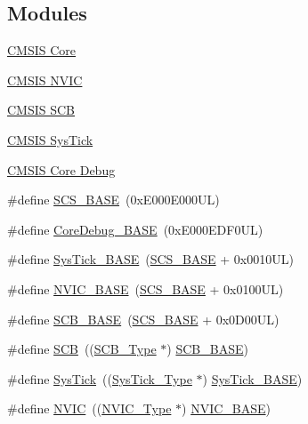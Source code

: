 \subsection*{Modules}
\begin{DoxyCompactItemize}
\item 
\hyperlink{group___c_m_s_i_s___c_o_r_e}{C\+M\+S\+I\+S Core}
\item 
\hyperlink{group___c_m_s_i_s___n_v_i_c}{C\+M\+S\+I\+S N\+V\+IC}
\item 
\hyperlink{group___c_m_s_i_s___s_c_b}{C\+M\+S\+I\+S S\+CB}
\item 
\hyperlink{group___c_m_s_i_s___sys_tick}{C\+M\+S\+I\+S Sys\+Tick}
\item 
\hyperlink{group___c_m_s_i_s___core_debug}{C\+M\+S\+I\+S Core Debug}
\end{DoxyCompactItemize}
\begin{DoxyCompactItemize}
\item 
\#define \hyperlink{group___c_m_s_i_s__core__register_ga3c14ed93192c8d9143322bbf77ebf770}{S\+C\+S\+\_\+\+B\+A\+SE}~(0x\+E000\+E000\+U\+L)
\item 
\#define \hyperlink{group___c_m_s_i_s__core__register_ga680604dbcda9e9b31a1639fcffe5230b}{Core\+Debug\+\_\+\+B\+A\+SE}~(0x\+E000\+E\+D\+F0\+U\+L)
\item 
\#define \hyperlink{group___c_m_s_i_s__core__register_ga58effaac0b93006b756d33209e814646}{Sys\+Tick\+\_\+\+B\+A\+SE}~(\hyperlink{group___c_m_s_i_s__core__register_ga3c14ed93192c8d9143322bbf77ebf770}{S\+C\+S\+\_\+\+B\+A\+SE} +  0x0010\+U\+L)
\item 
\#define \hyperlink{group___c_m_s_i_s__core__register_gaa0288691785a5f868238e0468b39523d}{N\+V\+I\+C\+\_\+\+B\+A\+SE}~(\hyperlink{group___c_m_s_i_s__core__register_ga3c14ed93192c8d9143322bbf77ebf770}{S\+C\+S\+\_\+\+B\+A\+SE} +  0x0100\+U\+L)
\item 
\#define \hyperlink{group___c_m_s_i_s__core__register_gad55a7ddb8d4b2398b0c1cfec76c0d9fd}{S\+C\+B\+\_\+\+B\+A\+SE}~(\hyperlink{group___c_m_s_i_s__core__register_ga3c14ed93192c8d9143322bbf77ebf770}{S\+C\+S\+\_\+\+B\+A\+SE} +  0x0\+D00\+U\+L)
\item 
\#define \hyperlink{group___c_m_s_i_s__core__register_gaaaf6477c2bde2f00f99e3c2fd1060b01}{S\+CB}~((\hyperlink{struct_s_c_b___type}{S\+C\+B\+\_\+\+Type} $\ast$)           \hyperlink{group___c_m_s_i_s__core__register_gad55a7ddb8d4b2398b0c1cfec76c0d9fd}{S\+C\+B\+\_\+\+B\+A\+SE})
\item 
\#define \hyperlink{group___c_m_s_i_s__core__register_gacd96c53beeaff8f603fcda425eb295de}{Sys\+Tick}~((\hyperlink{struct_sys_tick___type}{Sys\+Tick\+\_\+\+Type} $\ast$)       \hyperlink{group___c_m_s_i_s__core__register_ga58effaac0b93006b756d33209e814646}{Sys\+Tick\+\_\+\+B\+A\+SE})
\item 
\#define \hyperlink{group___c_m_s_i_s__core__register_gac8e97e8ce56ae9f57da1363a937f8a17}{N\+V\+IC}~((\hyperlink{struct_n_v_i_c___type}{N\+V\+I\+C\+\_\+\+Type} $\ast$)          \hyperlink{group___c_m_s_i_s__core__register_gaa0288691785a5f868238e0468b39523d}{N\+V\+I\+C\+\_\+\+B\+A\+SE})
\end{DoxyCompactItemize}


